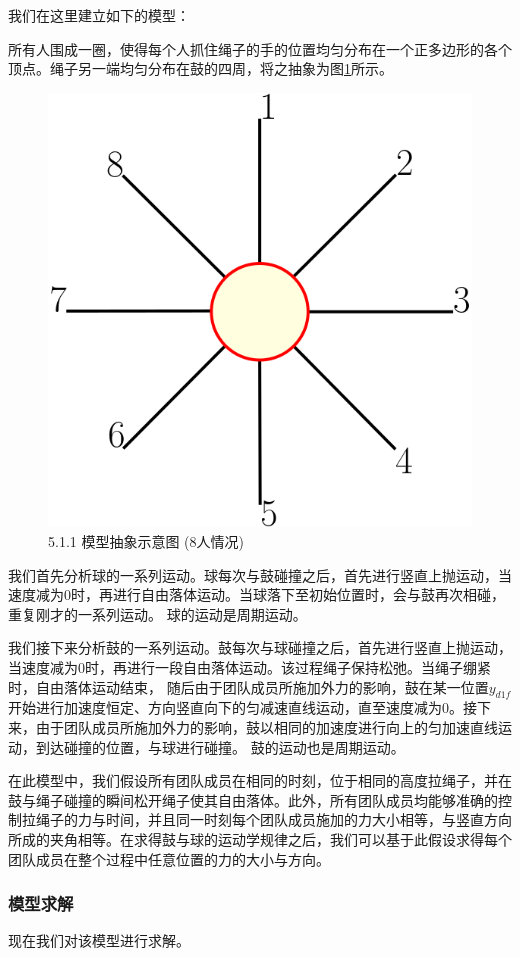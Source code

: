\documentclass[nocover]{cumcmart}%
\begin{document}
我们在这里建立如下的模型：

所有人围成一圈，使得每个人抓住绳子的手的位置均匀分布在一个正多边形的各个顶点。绳子另一端均匀分布在鼓的四周，将之抽象为图\ref{5.1.1 模型抽象示意图}所示。
\begin{figure}[h!]
    \centering
    \includegraphics[width=0.4\linewidth]{figures/f1.png}
    \caption{5.1.1 模型抽象示意图 (8人情况)}
    \label{5.1.1 模型抽象示意图}
\end{figure}

我们首先分析球的一系列运动。球每次与鼓碰撞之后，首先进行竖直上抛运动，当速度减为0时，再进行自由落体运动。当球落下至初始位置时，会与鼓再次相碰，重复刚才的一系列运动。
球的运动是周期运动。

我们接下来分析鼓的一系列运动。鼓每次与球碰撞之后，首先进行竖直上抛运动，当速度减为0时，再进行一段自由落体运动。该过程绳子保持松弛。当绳子绷紧时，自由落体运动结束，
随后由于团队成员所施加外力的影响，鼓在某一位置$y_{d1f}$开始进行加速度恒定、方向竖直向下的匀减速直线运动，直至速度减为0。接下来，由于团队成员所施加外力的影响，鼓以相同的加速度进行向上的匀加速直线运动，到达碰撞的位置，与球进行碰撞。
鼓的运动也是周期运动。

在此模型中，我们假设所有团队成员在相同的时刻，位于相同的高度拉绳子，并在鼓与绳子碰撞的瞬间松开绳子使其自由落体。此外，所有团队成员均能够准确的控制拉绳子的力与时间，并且同一时刻每个团队成员施加的力大小相等，与竖直方向所成的夹角相等。在求得鼓与球的运动学规律之后，我们可以基于此假设求得每个团队成员在整个过程中任意位置的力的大小与方向。
\subsubsection{模型求解}
现在我们对该模型进行求解。
\end{document}
